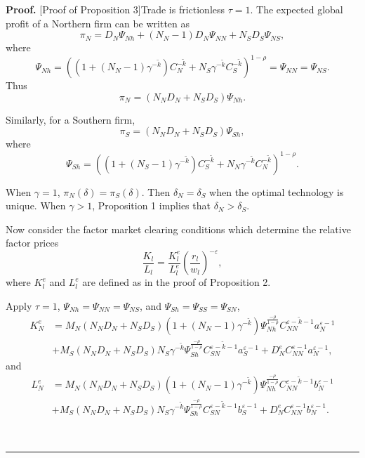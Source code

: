 \documentclass[notitlepage,11pt]{article}%
\newenvironment{proof}[1][Proof]{\noindent \textbf{#1.} }{\  \rule{0.5em}{0.5em}}
\begin{document}
\begin{proof}
[Proof of Proposition 3]Trade is frictionless $\tau=1$. The expected global
profit of a Northern firm can be written as%
\[
\pi_{N}=D_{N}\Psi_{Nh}+\left(  N_{N}-1\right)  D_{N}\Psi_{NN}+N_{S}D_{S}%
\Psi_{NS},
\]
where%
\[
\Psi_{Nh}=\left(  \left(  1+\left(  N_{N}-1\right)  \gamma^{-\tilde{k}%
}\right)  C_{N}^{-\tilde{k}}+N_{S}\gamma^{-\tilde{k}}C_{S}^{-\tilde{k}%
}\right)  ^{1-\rho}=\Psi_{NN}=\Psi_{NS}.
\]
Thus%
\[
\pi_{N}=\left(  N_{N}D_{N}+N_{S}D_{S}\right)  \Psi_{Nh}.
\]


Similarly, for a Southern firm,%
\[
\pi_{S}=\left(  N_{N}D_{N}+N_{S}D_{S}\right)  \Psi_{Sh},
\]
where%
\[
\Psi_{Sh}=\left(  \left(  1+\left(  N_{S}-1\right)  \gamma^{-\tilde{k}%
}\right)  C_{S}^{-\tilde{k}}+N_{N}\gamma^{-\tilde{k}}C_{N}^{-\tilde{k}%
}\right)  ^{1-\rho}.
\]


When $\gamma=1$, $\pi_{N}\left(  \delta\right)  =\pi_{S}\left(  \delta\right)
$. Then $\delta_{N}=\delta_{S}$ when the optimal technology is unique. When
$\gamma>1$, Proposition 1 implies that $\delta_{N}>\delta_{S}$.

Now consider the factor market clearing conditions which determine the
relative factor prices%
\[
\frac{K_{l}}{L_{l}}=\frac{K_{l}^{e}}{L_{l}^{e}}\left(  \frac{r_{l}}{w_{l}%
}\right)  ^{-\varepsilon},
\]
where $K_{l}^{e}$ and $L_{l}^{e}$ are defined as in the proof of Proposition 2.

Apply $\tau=1$, $\Psi_{Nh}=\Psi_{NN}=\Psi_{NS}$, and $\Psi_{Sh}=\Psi_{SS}%
=\Psi_{SN}$,%
\begin{align*}
K_{N}^{e}  &  =M_{N}\left(  N_{N}D_{N}+N_{S}D_{S}\right)  \left(  1+\left(
N_{N}-1\right)  \gamma^{-\tilde{k}}\right)  \Psi_{Nh}^{\frac{-\rho}{1-\rho}%
}C_{NN}^{\varepsilon-\tilde{k}-1}a_{N}^{\varepsilon-1}\\
&  +M_{S}\left(  N_{N}D_{N}+N_{S}D_{S}\right)  N_{S}\gamma^{-\tilde{k}}%
\Psi_{Sh}^{\frac{-\rho}{1-\rho}}C_{SN}^{\varepsilon-\tilde{k}-1}%
a_{S}^{\varepsilon-1}+D_{N}^{e}C_{NN}^{\varepsilon-1}a_{N}^{\varepsilon-1},
\end{align*}
and%
\begin{align*}
L_{N}^{e}  &  =M_{N}\left(  N_{N}D_{N}+N_{S}D_{S}\right)  \left(  1+\left(
N_{N}-1\right)  \gamma^{-\tilde{k}}\right)  \Psi_{Nh}^{\frac{-\rho}{1-\rho}%
}C_{NN}^{\varepsilon-\tilde{k}-1}b_{N}^{\varepsilon-1}\\
&  +M_{S}\left(  N_{N}D_{N}+N_{S}D_{S}\right)  N_{S}\gamma^{-\tilde{k}}%
\Psi_{Sh}^{\frac{-\rho}{1-\rho}}C_{SN}^{\varepsilon-\tilde{k}-1}%
b_{S}^{\varepsilon-1}+D_{N}^{e}C_{NN}^{\varepsilon-1}b_{N}^{\varepsilon-1}.
\end{align*}



\end{proof}
\end{document}
